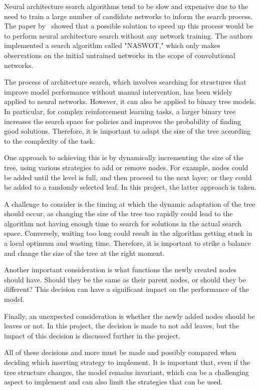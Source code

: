 Neural architecture search algorithms tend to be slow and expensive due to the need to train a large number of candidate networks to inform the search process. The paper by~\cite{mellor_neural_2021} showed that a possible solution to speed up this process would be to perform neural architecture search without any network training. The authors implemented a search algorithm called "NASWOT," which only makes observations on the initial untrained networks in the scope of convolutional networks.

The process of architecture search, which involves searching for structures that improve model performance without manual intervention, has been widely applied to neural networks. However, it can also be applied to binary tree models. In particular, for complex reinforcement learning tasks, a larger binary tree increases the search space for policies and improves the probability of finding good solutions. Therefore, it is important to adapt the size of the tree according to the complexity of the task.

One approach to achieving this is by dynamically incrementing the size of the tree, using various strategies to add or remove nodes. For example, nodes could be added until the level is full, and then proceed to the next layer; or they could be added to a randomly selected leaf. In this project, the latter approach is taken.

A challenge to consider is the timing at which the dynamic adaptation of the tree should occur, as changing the size of the tree too rapidly could lead to the algorithm not having enough time to search for solutions in the actual search space. Conversely, waiting too long could result in the algorithm getting stuck in a local optimum and wasting time. Therefore, it is important to strike a balance and change the size of the tree at the right moment.

Another important consideration is what functions the newly created nodes should have. Should they be the same as their parent nodes, or should they be different? This decision can have a significant impact on the performance of the model.

Finally, an unexpected consideration is whether the newly added nodes should be leaves or not. In this project, the decision is made to not add leaves, but the impact of this decision is discussed further in the project.

All of these decisions and more must be made and possibly compared when deciding which inserting strategy to implement. It is important that, even if the tree structure changes, the model remains invariant, which can be a challenging aspect to implement and can also limit the strategies that can be used.


